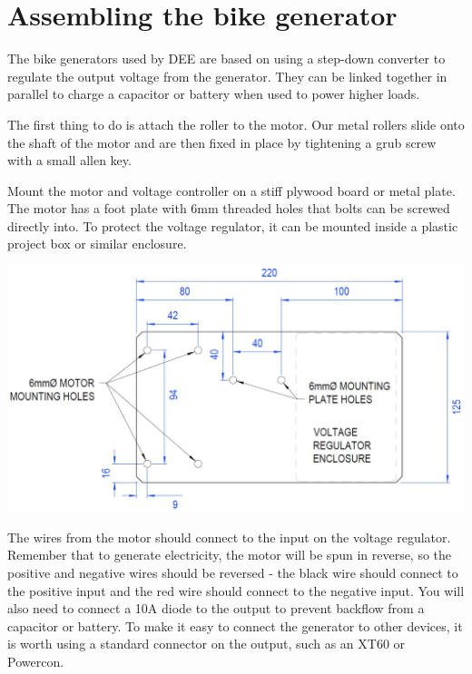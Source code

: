 \documentclass{article}
\theoremstyle{definition}
\theoremstyle{definition}
\theoremstyle{remark}
\begin{document}

{\color{blue}\section{Assembling the bike generator}} %
\label{sec:assembling_the_bike_generator}

  The bike generators used by DEE are based on using a step-down converter to regulate the output voltage from the generator. They can be linked together in parallel to charge a capacitor or battery when used to power higher loads.

  The first thing to do is attach the roller to the motor. Our metal rollers slide onto the shaft of the motor and are then fixed in place by tightening a grub screw with a small allen key. 

  Mount the motor and voltage controller on a stiff plywood board or metal plate. The motor has a foot plate with 6mm threaded holes that bolts can be screwed directly into. To protect the voltage regulator, it can be mounted inside a plastic project box or similar enclosure. 

  \begin{center}
    \includegraphics[width=0.75\paperwidth]{Images/image_4_1_(mounting_board).png}
  \end{center}

  The wires from the motor should connect to the input on the voltage regulator. Remember that to generate electricity, the motor will be spun in reverse, so the positive and negative wires should be reversed - the black wire should connect to the positive input and the red wire should connect to the negative input. You will also need to connect a 10A diode to the output to prevent backflow from a capacitor or battery. To make it easy to connect the generator to other devices, it is worth using a standard connector on the output, such as an XT60 or Powercon.
\end{document}

